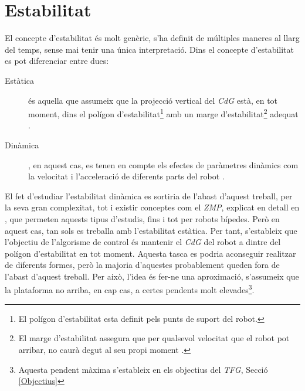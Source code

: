 \documentclass[12pt,a4paper,final,twoside]{report}
\begin{document}


\section{Estabilitat}
\label{Estabilitat}

El concepte d'estabilitat és molt genèric, s'ha definit de múltiples maneres al llarg del temps, sense mai tenir una única interpretació. Dins el concepte d'estabilitat es pot diferenciar entre dues:
\begin{description}

\item[Estàtica] és aquella que assumeix que la projecció vertical del \textit{CdG} està, en tot moment, dins el polígon d'estabilitat\footnote{El polígon d'estabilitat esta definit pels punts de suport del robot.} amb un marge d'estabilitat\footnote{El marge d'estabilitat assegura que per qualsevol velocitat que el robot pot arribar, no caurà degut al seu propi moment \cite{Hugel1999}.} adequat \cite{Hugel1999}.

\item[Dinàmica], en aquest cas, es tenen en compte els efectes de paràmetres dinàmics com la velocitat i l'acceleració de diferents parts del robot \cite{Yazdani2012}.

\end{description}

El fet d'estudiar l'estabilitat dinàmica es sortiria de l'abast d'aquest treball, per la seva gran complexitat, tot i existir conceptes com el \textit{ZMP}, explicat en detall en \cite{Vukobratovic2004}, que permeten aquests tipus d'estudis, fins i tot per robots bípedes. Però en aquest cas, tan sols es treballa amb l'estabilitat estàtica. Per tant, s'estableix que l'objectiu de l'algorisme de control és mantenir el \textit{CdG} del robot a dintre del polígon d'estabilitat en tot moment. Aquesta tasca es podria aconseguir realitzar de diferents formes, però la majoria d'aquestes probablement queden fora de l'abast d'aquest treball. Per això, l'idea és fer-ne una aproximació, s'assumeix que la plataforma no arriba, en cap cas, a certes pendents molt elevades\footnote{Aquesta pendent màxima s'estableix en els objectius del \textit{TFG}, Secció \ref{Objectius}}. 
\end{document}
